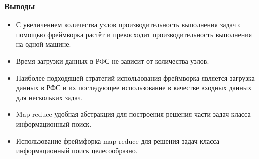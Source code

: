 \documentclass[utf8]{beamer}
\begin{document}
    \begin{frame}
    \frametitle{Выводы}
        \begin{itemize}
            \item С увеличением количества узлов производительность выполнения задач с помощью фреймворка растёт и превосходит производительность выполнения на одной машине.
            \item Время загрузки данных в РФС не зависит от количества узлов.
            \item Наиболее подходящей стратегий использования фреймворка является загрузка данных в РФС и их последующее использование в качестве входных данных для нескольких задач.
            \item Map-reduce удобная абстракция для построения решения части задач класса информационный поиск.
            \item Использование фреймфорка map-reduce для решения задач класса информационный поиск целесообразно.
        \end{itemize}
    \end{frame}

\begin{frame}
    \titlepage
\end{frame}
\end{document}
